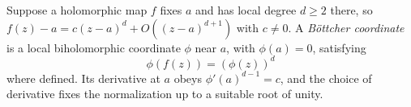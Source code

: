 
Suppose a holomorphic map $f$ fixes $a$ and has local degree $d\ge2$ there, so $f(z)-a=c(z-a)^d+O((z-a)^{d+1})$ with $c\ne0$. A \emph{Böttcher coordinate} is a local biholomorphic coordinate $\phi$ near $a$, with $\phi(a)=0$, satisfying
\[
\phi(f(z))=(\phi(z))^d
\]
where defined. Its derivative at $a$ obeys $\phi'(a)^{d-1}=c$, and the choice of derivative fixes the normalization up to a suitable root of unity.
